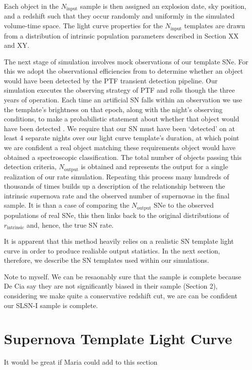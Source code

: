 \documentclass[a4paper,fleqn,usenatbib]{mnras}
\newcommand{\chris}[1]{\color{orange}#1\color{black}}
\begin{document}
Each object in the $N_\mathrm{input}$ sample is then assigned an explosion date, sky position, and a redshift such that they occur randomly and uniformly in the simulated volume-time space. The light curve properties for the $N_\mathrm{input}$ templates are drawn from a distribution of intrinsic population parameters described in Section XX and XY.

The next stage of simulation involves mock observations of our template SNe. For this we adopt the observational efficiencies from \citet{Frohmaier17} to determine whether an object would have been detected by the PTF transient detection pipeline. Our simulation executes the observing strategy of PTF and rolls though the three years of operation. Each time an artificial SN falls within an observation we use the template's brightness on that epoch, along with the night's observing conditions, to make a probabilistic statement about whether that object would have been detected \citep[an example for Type Ia SNe is presented in][]{Frohmaier17}. We require that our SN must have been `detected' on at least 4 separate nights over our light curve template's duration, at which point we are confident a real object matching these requirements object would have obtained a spectroscopic classification. The total number of objects passing this detection criteria, $N_\mathrm{output}$ is obtained and represents the output for a single realization of our rate simulation. Repeating this process many hundreds of thousands of times builds up a description of the relationship between the intrinsic supernova rate and the observed number of supernovae in the final sample. It is than a case of comparing the $N_\mathrm{output}$ SNe to the  observed populations of real SNe, this then links back to the original distributions of $r_\mathrm{intrinsic}$ and, hence, the true SN rate.

It is apparent that this method heavily relies on a realistic SN template light curve in order to produce realiable output statistics. In the next section, therefore, we describe the SN templates used within our simulations.

\chris{Note to myself. We can be resaonably sure that the sample is complete because De Cia say they are not significantly biased in their sample (Section 2), considering we make quite a conservative redshift cut, we are can be confident our SLSN-I sample is complete.}

\section{Supernova Template Light Curve}
\chris{It would be great if Maria could add to this section}
\end{document}
